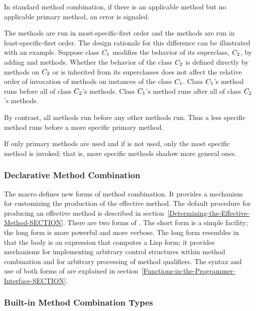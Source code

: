 In standard method combination, if there is an applicable method
but no applicable primary method, an error is signaled.

The  methods are run in most-specific-first order and
the  methods are run in least-specific-first order.  The
design rationale for this difference can be illustrated with an
example.  Suppose class $C _ 1$ modifies the behavior of its
superclass, $C _ 2$, by adding  and 
methods. Whether the behavior of the class $C_ 2$ is defined
directly by methods on $C_ 2$ or is inherited from its superclasses
does not affect the relative order of invocation of methods on
instances of the class $C_ 1$.  Class $C _ 1$'s 
method runs before all of class $C _ 2$'s methods.  Class $C _
1$'s  method runs after all of class $C _ 2$'s methods.

By contrast, all  methods run before any other methods
run.  Thus a less specific  method runs before a more
specific primary method.

If only primary methods are used and if  is not
used, only the most specific method is invoked; that is, more specific
methods shadow more general ones. 

\subsubsection{Declarative Method Combination}

The macro  defines new forms of method
combination.  It provides a mechanism for customizing the production
of the effective method. The default procedure for producing an
effective method is described in
section~\ref{Determining-the-Effective-Method-SECTION}.
There are two forms of 
.  The short form is a simple facility;
the long form is more powerful and more verbose.  The long form
resembles  in that the body is an expression that
computes a Lisp form; it provides mechanisms for implementing
arbitrary control structures within method combination and for
arbitrary processing of method qualifiers.  The syntax and use of both
forms of  are explained in
section~\ref{Functions-in-the-Programmer-Interface-SECTION}.


\subsubsection{Built-in Method Combination Types}
\label{Built-in-Method-Combination-Types-SECTION}

